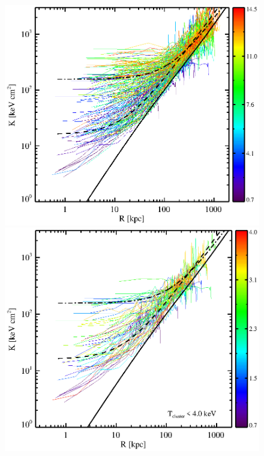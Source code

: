 \begin{center}
  \begin{figure}[htp]
    \begin{minipage}[htp]{0.5\linewidth}
      \includegraphics*[width=\textwidth, trim=28mm 7mm 30mm 17mm, clip]{splots_allt.eps}
    \end{minipage}
    \begin{minipage}[htp]{0.5\linewidth}
      \includegraphics*[width=\textwidth, trim=28mm 7mm 30mm 17mm, clip]{splots_tle4.eps}

\end{minipage}
\end{figure}
\end{center}
